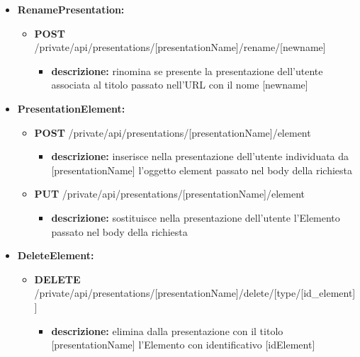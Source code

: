 {\begin{itemize}
\begin{itemize}
			\item  \textbf{DELETE} /private/api/presentations/[presentationName]
				\begin{itemize} 
				\item \textbf{descrizione:} elimina se presente la presentazione dell'utente associata al titolo passato nell'URL
				\end{itemize}
			\end{itemize}

		\item \textbf{RenamePresentation:}
			\begin{itemize}
			\item  \textbf{POST} /private/api/presentations/[presentationName]/rename/[newname] 
				\begin{itemize} 
				\item \textbf{descrizione:} rinomina se presente la presentazione dell'utente associata al titolo passato nell'URL con il nome [newname]
				\end{itemize}
			\end{itemize}
			
		\item \textbf{PresentationElement:}
			\begin{itemize}
			\item   \textbf{POST} /private/api/presentations/[presentationName]/element
				\begin{itemize} 
				\item \textbf{descrizione:} inserisce nella presentazione dell'utente individuata da [presentationName] l'oggetto element passato nel body della richiesta
				\end{itemize}
				
			\item  \textbf{PUT} /private/api/presentations/[presentationName]/element
				\begin{itemize} 
				\item \textbf{descrizione:} sostituisce nella presentazione dell'utente l'Elemento passato nel body della richiesta
				\end{itemize}
			\end{itemize}
				
		\item \textbf{DeleteElement:}
			\begin{itemize}
			\item   \textbf{DELETE} /private/api/presentations/[presentationName]/delete/[type/[id\_element]]
				\begin{itemize} 
				\item \textbf{descrizione:} elimina dalla presentazione con il titolo [presentationName] l'Elemento con identificativo [idElement]						
				\end{itemize}
			\end{itemize}
		

\end{itemize}}
